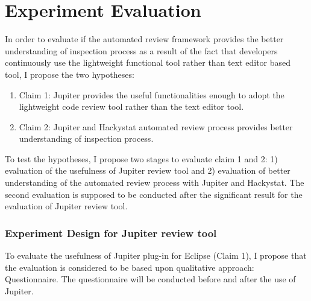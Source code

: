
\chapter{Experiment Evaluation}
\label{sec:evaluation}

In order to evaluate if the automated review framework provides the
better understanding of inspection process as a result of the fact
that developers continuously use the lightweight functional tool
rather than text editor based tool, I propose the two hypotheses:

\begin{enumerate}
\item Claim 1: Jupiter provides the useful functionalities enough to
adopt the lightweight code review tool rather than the text editor
tool.

\item Claim 2: Jupiter and Hackystat automated review process provides
better understanding of inspection process.
\end{enumerate}

To test the hypotheses, I propose two stages to evaluate claim 1 and
2:  1) evaluation of the usefulness of Jupiter review tool and 2)
evaluation of better understanding of the automated review process
with Jupiter and Hackystat. The second evaluation is supposed to be
conducted after the significant result for the evaluation of Jupiter
review tool.

\subsection{Experiment Design for Jupiter review tool}

To evaluate the usefulness of Jupiter plug-in for Eclipse (Claim 1),
I propose that the evaluation is considered to be based upon
qualitative approach: Questionnaire. The questionnaire will be
conducted before and after the use of Jupiter.

